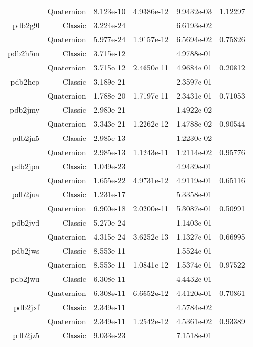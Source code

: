 \begin{xltabular}{\textwidth}{r|rS[table-format=1.3e+2]S[table-format=1.4e+2]S[table-format=1.4e+2]S[table-format=-1.5]}
& Quaternion & 8.123e-10 & 4.9386e-12 & 9.9432e-03 & 1.12297\\  \addlinespace
pdb2g9l & Classic & 3.224e-24 &  & 6.6193e-02 & \\
& Quaternion & 5.977e-24 & 1.9157e-12 & 6.5694e-02 & 0.75826\\  \addlinespace
pdb2h5m & Classic & 3.715e-12 &  & 4.9788e-01 & \\
& Quaternion & 3.715e-12 & 2.4650e-11 & 4.9684e-01 & 0.20812\\  \addlinespace
pdb2hep & Classic & 3.189e-21 &  & 2.3597e-01 & \\
& Quaternion & 1.788e-20 & 1.7197e-11 & 2.3431e-01 & 0.71053\\  \addlinespace
pdb2jmy & Classic & 2.980e-21 &  & 1.4922e-02 & \\
& Quaternion & 3.343e-21 & 1.2262e-12 & 1.4788e-02 & 0.90544\\  \addlinespace
pdb2jn5 & Classic & 2.985e-13 &  & 1.2230e-02 & \\
& Quaternion & 2.985e-13 & 1.1243e-11 & 1.2114e-02 & 0.95776\\  \addlinespace
pdb2jpn & Classic & 1.049e-23 &  & 4.9439e-01 & \\
& Quaternion & 1.655e-22 & 4.9731e-12 & 4.9119e-01 & 0.65116\\  \addlinespace
pdb2jua & Classic & 1.231e-17 &  & 5.3358e-01 & \\
& Quaternion & 6.900e-18 & 2.0200e-11 & 5.3087e-01 & 0.50991\\  \addlinespace
pdb2jvd & Classic & 5.270e-24 &  & 1.1403e-01 & \\
& Quaternion & 4.315e-24 & 3.6252e-13 & 1.1327e-01 & 0.66995\\  \addlinespace
pdb2jws & Classic & 8.553e-11 &  & 1.5524e-01 & \\
& Quaternion & 8.553e-11 & 1.0841e-12 & 1.5374e-01 & 0.97522\\  \addlinespace
pdb2jwu & Classic & 6.308e-11 &  & 4.4432e-01 & \\
& Quaternion & 6.308e-11 & 6.6652e-12 & 4.4120e-01 & 0.70861\\  \addlinespace
pdb2jxf & Classic & 2.349e-11 &  & 4.5784e-02 & \\
& Quaternion & 2.349e-11 & 1.2542e-12 & 4.5361e-02 & 0.93389\\  \addlinespace
pdb2jz5 & Classic & 9.033e-23 &  & 7.1518e-01 & \\

\end{xltabular}
